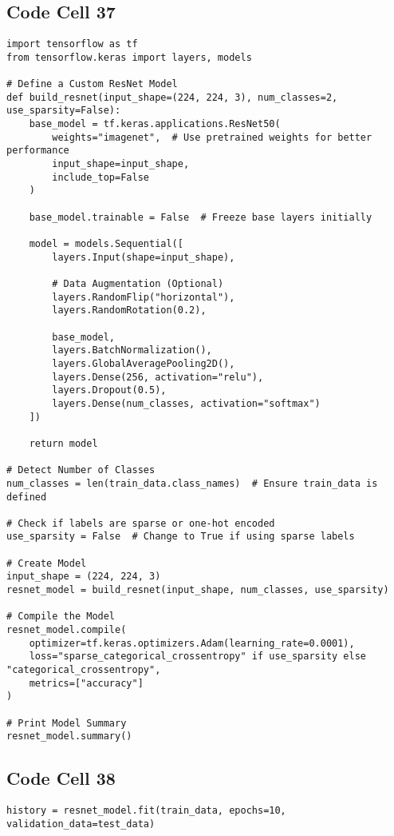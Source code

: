 \documentclass{article}
\begin{document}
\subsection*{Code Cell 37}
\begin{lstlisting}
import tensorflow as tf
from tensorflow.keras import layers, models

# Define a Custom ResNet Model
def build_resnet(input_shape=(224, 224, 3), num_classes=2, use_sparsity=False):
    base_model = tf.keras.applications.ResNet50(
        weights="imagenet",  # Use pretrained weights for better performance
        input_shape=input_shape,
        include_top=False
    )

    base_model.trainable = False  # Freeze base layers initially

    model = models.Sequential([
        layers.Input(shape=input_shape),

        # Data Augmentation (Optional)
        layers.RandomFlip("horizontal"),
        layers.RandomRotation(0.2),

        base_model,
        layers.BatchNormalization(),
        layers.GlobalAveragePooling2D(),
        layers.Dense(256, activation="relu"),
        layers.Dropout(0.5),
        layers.Dense(num_classes, activation="softmax")
    ])

    return model

# Detect Number of Classes
num_classes = len(train_data.class_names)  # Ensure train_data is defined

# Check if labels are sparse or one-hot encoded
use_sparsity = False  # Change to True if using sparse labels

# Create Model
input_shape = (224, 224, 3)
resnet_model = build_resnet(input_shape, num_classes, use_sparsity)

# Compile the Model
resnet_model.compile(
    optimizer=tf.keras.optimizers.Adam(learning_rate=0.0001),
    loss="sparse_categorical_crossentropy" if use_sparsity else "categorical_crossentropy",
    metrics=["accuracy"]
)

# Print Model Summary
resnet_model.summary()

\end{lstlisting}

\subsection*{Code Cell 38}
\begin{lstlisting}
history = resnet_model.fit(train_data, epochs=10, validation_data=test_data)
\end{lstlisting}
\end{document}
